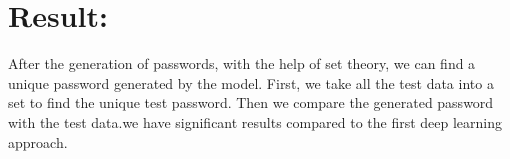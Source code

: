 \documentclass[runningheads]{llncs}
\begin{document}
\section{Result:}
\newline
{{After the generation of passwords, with the help of set theory, we can find a unique password generated by the model. First, we take all the test data into a set to find the unique test password. Then we compare the generated password with the test data.we have significant results compared to the first deep learning approach.
\newline

\begin{table}[htb]
\centering
\caption{Result of passgan using the Rockyou data set in 199000 iterations}
\label{}

\end{table}


\par
\begin{table}[htb]
\centering
\caption{Result of bipassgan using the My space data in 160000 iteration}
\label{}
\end{table}

}}
\end{document}
